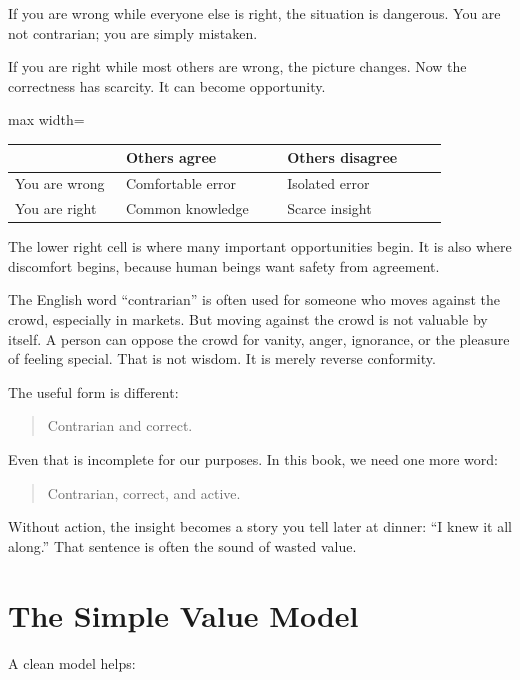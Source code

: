 If you are wrong while everyone else is right, the situation is dangerous. You are not contrarian; you are simply mistaken.

If you are right while most others are wrong, the picture changes. Now the correctness has scarcity. It can become opportunity.

\begin{center}
\begin{adjustbox}{max width=\linewidth}
\begin{tabular}{p{0.22\linewidth}p{0.32\linewidth}p{0.32\linewidth}}
\hline
 & Others agree & Others disagree \\
\hline
You are wrong & Comfortable error & Isolated error \\
You are right & Common knowledge & Scarce insight \\
\hline
\end{tabular}
\end{adjustbox}
\end{center}

The lower right cell is where many important opportunities begin. It is also where discomfort begins, because human beings want safety from agreement.

The English word ``contrarian'' is often used for someone who moves against the crowd, especially in markets. But moving against the crowd is not valuable by itself. A person can oppose the crowd for vanity, anger, ignorance, or the pleasure of feeling special. That is not wisdom. It is merely reverse conformity.

The useful form is different:

\begin{quote}
Contrarian and correct.
\end{quote}

Even that is incomplete for our purposes. In this book, we need one more word:

\begin{quote}
Contrarian, correct, and active.
\end{quote}

Without action, the insight becomes a story you tell later at dinner: ``I knew it all along.'' That sentence is often the sound of wasted value.

\section*{The Simple Value Model}

A clean model helps:

